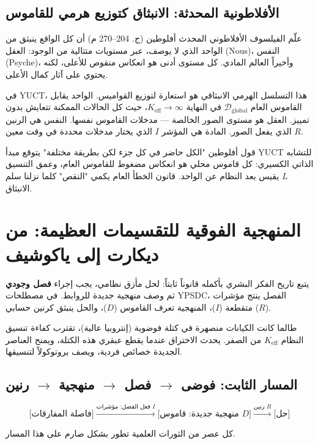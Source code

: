 \documentclass[12pt,a4paper]{article}
\begin{document}
	\subsection{الأفلاطونية المحدثة: الانبثاق كتوزيع هرمي للقاموس}
	
	علّم الفيلسوف الأفلاطوني المحدث أفلوطين (ج. 204–270 م) أن كل الواقع ينبثق من الواحد الذي لا يوصف، عبر مستويات متتالية من الوجود: العقل (Nous)، النفس (Psyche)، وأخيراً العالم المادي. كل مستوى أدنى هو انعكاس منقوص للأعلى، لكنه يحتوي على آثار كمال الأعلى.
	
	في YUCT، هذا التسلسل الهرمي الانبثاقي هو استعارة لتوزيع القواميس. الواحد يقابل القاموس العام \(\mathcal{D}_{\text{global}}\) في النهاية \(K_{\mathrm{eff}} \to \infty\)، حيث كل الحالات الممكنة تتعايش بدون تمييز. العقل هو مستوى الصور الخالصة — مدخلات القاموس نفسها. النفس هي الرنين \(R\) الذي يفعل الصور. المادة هي المؤشر \(I\) الذي يختار مدخلات محددة في وقت معين.
	
	قول أفلوطين "الكل حاضر في كل جزء لكن بطريقة مختلفة" يتوقع مبدأ YUCT للتشابه الذاتي الكسيري: كل قاموس محلي هو انعكاس مضغوط للقاموس العام، وعمق التنسيق \(L\) يقيس بعد النظام عن الواحد. قانون الخطأ العام يكمي "النقص" كلما نزلنا سلم الانبثاق.
	
	\section{المنهجية الفوقية للتقسيمات العظيمة: من ديكارت إلى ياكوشيف}
	
	يتبع تاريخ الفكر البشري بأكمله قانوناً ثابتاً: لحل مأزق نظامي، يجب إجراء \textbf{فصل وجودي} ثم وصف منهجية جديدة للروابط. في مصطلحات YPSDC، الفصل ينتج مؤشرات متقطعة (\(I\))، المنهجية تعرف القاموس (\(D\))، والحل ينبثق كرنين حسابي (\(R\)).
	
	طالما كانت الكيانات منصهرة في كتلة فوضوية (إنتروبيا عالية)، تقترب كفاءة تنسيق النظام \(K_{\mathrm{eff}}\) من الصفر. يحدث الاختراق عندما يقطع عبقري هذه الكتلة، ويمنح العناصر الجديدة خصائص فردية، ويصف بروتوكولاً لتنسيقها.
	
	\subsection{المسار الثابت: فوضى \(\to\) فصل \(\to\) منهجية \(\to\) رنين}
	
	\[
	\text{[فاصلة المفارقات]} \xrightarrow{\text{فعل الفصل: مؤشرات } I} \text{[منهجية جديدة: قاموس } D\text{]} \xrightarrow{\text{رنين } R} \text{[حل]}
	\]
	
	كل عصر من الثورات العلمية تطور بشكل صارم على هذا المسار.
	
\end{document}
